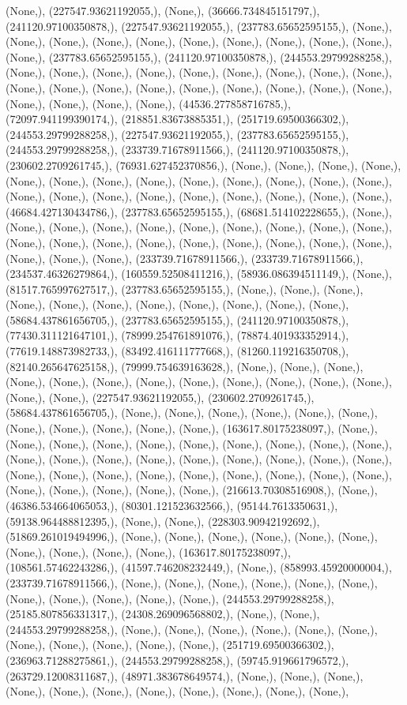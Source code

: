 \documentclass{article}
\begin{document}
(None,), (227547.93621192055,), (None,), (36666.734845151797,), (241120.97100350878,), (227547.93621192055,), (237783.65652595155,), (None,), (None,), (None,), (None,), (None,), (None,), (None,), (None,), (None,), (None,), (None,), (237783.65652595155,), (241120.97100350878,), (244553.29799288258,), (None,), (None,), (None,), (None,), (None,), (None,), (None,), (None,), (None,), (None,), (None,), (None,), (None,), (None,), (None,), (None,), (None,), (None,), (None,), (None,), (None,), (None,), (44536.277858716785,), (72097.941199390174,), (218851.83673885351,), (251719.69500366302,), (244553.29799288258,), (227547.93621192055,), (237783.65652595155,), (244553.29799288258,), (233739.71678911566,), (241120.97100350878,), (230602.2709261745,), (76931.627452370856,), (None,), (None,), (None,), (None,), (None,), (None,), (None,), (None,), (None,), (None,), (None,), (None,), (None,), (None,), (None,), (None,), (None,), (None,), (None,), (None,), (None,), (None,), (46684.427130434786,), (237783.65652595155,), (68681.514102228655,), (None,), (None,), (None,), (None,), (None,), (None,), (None,), (None,), (None,), (None,), (None,), (None,), (None,), (None,), (None,), (None,), (None,), (None,), (None,), (None,), (None,), (None,), (233739.71678911566,), (233739.71678911566,), (234537.46326279864,), (160559.52508411216,), (58936.086394511149,), (None,), (81517.765997627517,), (237783.65652595155,), (None,), (None,), (None,), (None,), (None,), (None,), (None,), (None,), (None,), (None,), (None,), (58684.437861656705,), (237783.65652595155,), (241120.97100350878,), (77430.311121647101,), (78999.254761891076,), (78874.401933352914,), (77619.148873982733,), (83492.416111777668,), (81260.119216350708,), (82140.265647625158,), (79999.754639163628,), (None,), (None,), (None,), (None,), (None,), (None,), (None,), (None,), (None,), (None,), (None,), (None,), (None,), (None,), (227547.93621192055,), (230602.2709261745,), (58684.437861656705,), (None,), (None,), (None,), (None,), (None,), (None,), (None,), (None,), (None,), (None,), (None,), (163617.80175238097,), (None,), (None,), (None,), (None,), (None,), (None,), (None,), (None,), (None,), (None,), (None,), (None,), (None,), (None,), (None,), (None,), (None,), (None,), (None,), (None,), (None,), (None,), (None,), (None,), (None,), (None,), (None,), (None,), (None,), (None,), (None,), (None,), (None,), (216613.70308516908,), (None,), (46386.534664065053,), (80301.121523632566,), (95144.7613350631,), (59138.964488812395,), (None,), (None,), (228303.90942192692,), (51869.261019494996,), (None,), (None,), (None,), (None,), (None,), (None,), (None,), (None,), (None,), (None,), (163617.80175238097,), (108561.57462243286,), (41597.746208232449,), (None,), (858993.45920000004,), (233739.71678911566,), (None,), (None,), (None,), (None,), (None,), (None,), (None,), (None,), (None,), (None,), (None,), (244553.29799288258,), (25185.807856331317,), (24308.269096568802,), (None,), (None,), (244553.29799288258,), (None,), (None,), (None,), (None,), (None,), (None,), (None,), (None,), (None,), (None,), (None,), (251719.69500366302,), (236963.71288275861,), (244553.29799288258,), (59745.919661796572,), (263729.12008311687,), (48971.383678649574,), (None,), (None,), (None,), (None,), (None,), (None,), (None,), (None,), (None,), (None,), (None,), 
\end{document}
